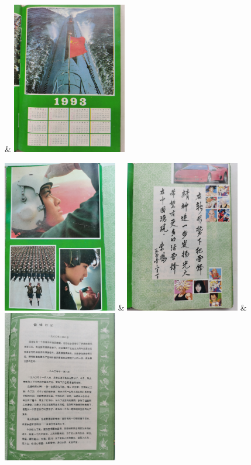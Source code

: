 \begin{tblr}{}
      & \includegraphics[width=5cm]{pic/军人日记-9.jpg}
  \end{tblr}

  \begin{tblr}{}
    \includegraphics[width=5cm]{pic/军人日记-a.jpg}
      & \includegraphics[width=5cm]{pic/军人日记-b.jpg}
      & \includegraphics[width=5cm]{pic/军人日记-c.jpg}
  \end{tblr}

